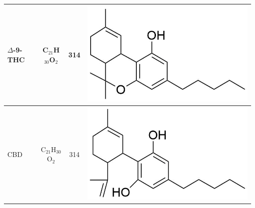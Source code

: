 \begin{table}
\begin{tabular}{lccc}
$\Delta$-9-THC & C$_{21}$H$_{30}$O$_2$ & 314 &  
\begin{minipage}[c]{0.3\linewidth}\centering
\includegraphics[height=0.1\textheight]{pics/other_drugs/THC_struct.png}\end{minipage}\\ \midrule
CBD & C$_{21}$H$_{30}$O$_2$ & 314 &  
\begin{minipage}[c]{0.3\linewidth}\centering
\includegraphics[height=0.1\textheight]{pics/other_drugs/CBD_struct.png}\end{minipage}\\ 
\bottomrule
\end{tabular}
\label{tab:DRs_structs}
\end{table}



